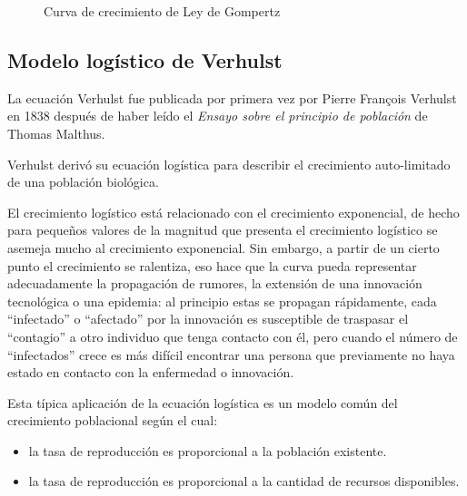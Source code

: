 \begin{figure}[!ht]
\begin{center}
\end{center}\vspace*{-0.6cm}
\caption[Curva de crecimiento de Ley de Gompertz]{Curva de crecimiento de Ley de Gompertz}
\label{fig-gompertz}
\end{figure}
\newpage

\subsection{Modelo logístico de Verhulst}
La ecuación Verhulst fue publicada por primera vez por Pierre François Verhulst en 1838 después de haber leído el \textit{Ensayo sobre el principio de población} de Thomas Malthus.

Verhulst derivó su ecuación logística para describir el crecimiento auto-limitado de una población biológica.

El crecimiento logístico está relacionado con el crecimiento exponencial, de hecho para pequeños valores de la magnitud que presenta el crecimiento logístico se asemeja mucho al crecimiento exponencial. Sin embargo, a partir de un cierto punto el crecimiento se ralentiza, eso hace que la curva pueda representar adecuadamente la propagación de rumores, la extensión de una innovación tecnológica o una epidemia: al principio estas se propagan rápidamente, cada ``infectado'' o ``afectado'' por la innovación es susceptible de traspasar el ``contagio'' a otro individuo que tenga contacto con él, pero cuando el número de ``infectados'' crece es más difícil encontrar una persona que previamente no haya estado en contacto con la enfermedad o innovación.

Esta típica aplicación de la ecuación logística es un modelo común del crecimiento poblacional según el cual:
\begin{itemize}
    \item la tasa de reproducción es proporcional a la población existente.
    \item la tasa de reproducción es proporcional a la cantidad de recursos disponibles.
\end{itemize}

